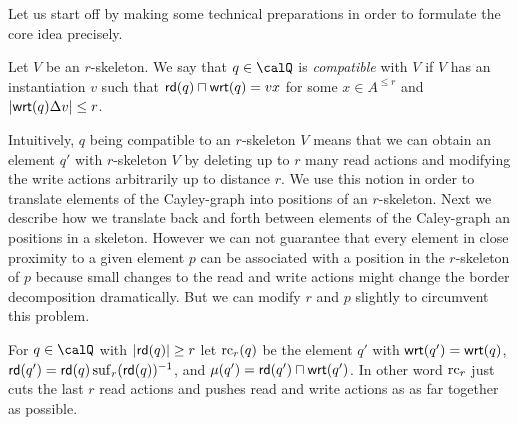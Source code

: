 Let us start off by making some technical preparations in order to formulate the core idea precisely.
\begin{definition}
	Let $V$ be an $r$-skeleton. We say that $q\in\Qx$ is \emph{compatible} with $V$ 
	if $V$ has an instantiation $v$ such that $\mathsf{rd}(q) \sqcap \mathsf{wrt}(q)= vx$ for some $x\in A^{\leq r}$ and 
	$|\mathsf{wrt}(q) \Delta v| \leq r$.
\end{definition}
Intuitively, $q$ being compatible to an $r$-skeleton $V$ means that we can obtain an element
$q'$ with $r$-skeleton $V$ by deleting up to $r$ many read actions and modifying the write
actions arbitrarily up to distance $r$. We use this notion in order to translate elements of the Cayley-graph
into positions of an $r$-skeleton. Next we describe how we translate back and forth between elements of the Caley-graph an positions in a skeleton.
However we can not guarantee that every element in close proximity to a given element $p$ can be associated with a position in the $r$-skeleton of $p$ because small changes to the read and write actions might change the border decomposition dramatically. But we can modify
$r$ and $p$ slightly to circumvent this problem.  
\begin{definition}
	For $q\in\Qx$ with $|\mathsf{rd}(q)| \geq r$ let $\operatorname{rc}_r(q)$ be the element $q'$  with $\mathsf{wrt}(q') = \mathsf{wrt}(q)$, $\mathsf{rd}(q')=\mathsf{rd}(q)\operatorname{suf}_{r}({\mathsf{rd}(q)})^{-1}$, and $\mu({q'}) = \mathsf{rd}(q') \sqcap \mathsf{wrt}(q')$.
	In other word $\operatorname{rc}_r$ just cuts the last $r$ read actions and pushes read and write actions as as far together as possible. 
\end{definition}
